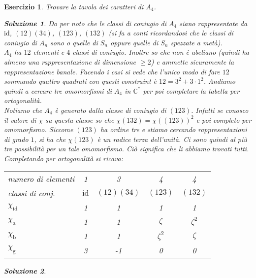 \documentclass[a4paper]{article}
\theoremstyle{break}
\newtheorem{ex}{{ \Large Esercizio} }
\theoremstyle{plain}
\newtheorem{sol}{Soluzione}[ex]
\begin{document}
\begin{ex}
Trovare la tavola dei caratteri di $A_4$.

\begin{sol}
	Do per noto che le classi di coniugio di $A_4$ siano rappresentate da $\text{id}$, $(1 2)(3 4)$, $(1 2 3)$, $(1 3 2)$ (si fa a conti ricordandosi che le classi di coniugio di $A_n$ sono o quelle di $S_n$ oppure quelle di $S_n$ spezzate a metà). \\
	$A_4$ ha $12$ elementi e $4$ classi di coniugio. Inoltre so che non è abeliano (quindi ha almeno una rappresentazione di dimensione $\ge 2$) e ammette sicuramente la rappresentazione banale. Facendo i casi si vede che l'unico modo di fare $12$ sommando quattro quadrati con questi constraint è $12 = 3^2 + 3 \cdot 1^2$. Andiamo quindi a cercare tre omomorfismi di $A_4$ in $\mathbb{C}^{*}$ per poi completare la tabella per ortogonalità. \\
	Notiamo che $A_4$ è generato dalla classe di coniugio di $(1 2 3)$. Infatti se conosco il valore di $\chi$ su questa classe so che $\chi (1 3 2) = \chi((1 2 3)) ^2$ e poi completo per omomorfismo. Siccome $(1 2 3)$ ha ordine tre e stiamo cercando rappresentazioni di grado $1$, si ha che $\chi (1 2 3)$ è un radice terza dell'unità. Ci sono quindi al più tre possibilità per un tale omomorfismo. Ciò significa che li abbiamo trovati tutti. \\
	Completando per ortogonalità si ricava:
	\begin{center} \begin{tabular}{lcccc}
	numero di elementi & 1   & 3   & 4   & 4   \\
	classi di conj. & $\text{id}$ & $(1 2)(3 4)$ & $(1 2 3)$ & $(1 3 2)$ \\ \hline
	$\chi_\text{id}$ & 1    & 1    & 1    & 1    \\
	$\chi_\text{a}$  & 1    & 1    & $\zeta$ & $\zeta^2$ \\
	$\chi_\text{b}$  & 1    & 1    & $\zeta^2$ & $\zeta$ \\
	$\chi_\text{g}$  & 3    & -1   & 0    & 0    \\
	\end{tabular} \end{center} \vskip 0.5cm
\end{sol}

\begin{sol}

\end{sol}


\end{ex}
\end{document}
